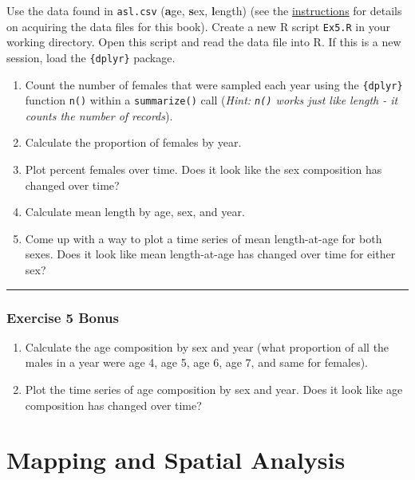\documentclass[]{book}
\providecommand{\tightlist}{%
  \setlength{\itemsep}{0pt}\setlength{\parskip}{0pt}}
\theoremstyle{definition}
\theoremstyle{definition}
\theoremstyle{definition}
\theoremstyle{remark}
\begin{document}
Use the data found in \texttt{asl.csv} (\textbf{a}ge, \textbf{s}ex,
\textbf{l}ength) (see the \protect\hyperlink{data-sets}{instructions}
for details on acquiring the data files for this book). Create a new R
script \texttt{Ex5.R} in your working directory. Open this script and
read the data file into R. If this is a new session, load the
\texttt{\{dplyr\}} package.

\begin{enumerate}
\def\labelenumi{\arabic{enumi}.}
\tightlist
\item
  Count the number of females that were sampled each year using the
  \texttt{\{dplyr\}} function \texttt{n()} within a \texttt{summarize()}
  call (\emph{Hint: \texttt{n()} works just like length - it counts the
  number of records}).
\item
  Calculate the proportion of females by year.
\item
  Plot percent females over time. Does it look like the sex composition
  has changed over time?
\item
  Calculate mean length by age, sex, and year.
\item
  Come up with a way to plot a time series of mean length-at-age for
  both sexes. Does it look like mean length-at-age has changed over time
  for either sex?
\end{enumerate}

\begin{center}\rule{0.5\linewidth}{\linethickness}\end{center}

\subsection*{Exercise 5 Bonus}\label{exercise-5-bonus}

\begin{enumerate}
\def\labelenumi{\arabic{enumi}.}
\tightlist
\item
  Calculate the age composition by sex and year (what proportion of all
  the males in a year were age 4, age 5, age 6, age 7, and same for
  females).
\item
  Plot the time series of age composition by sex and year. Does it look
  like age composition has changed over time?
\end{enumerate}

\chapter{Mapping and Spatial Analysis}\label{ch6}
\end{document}
